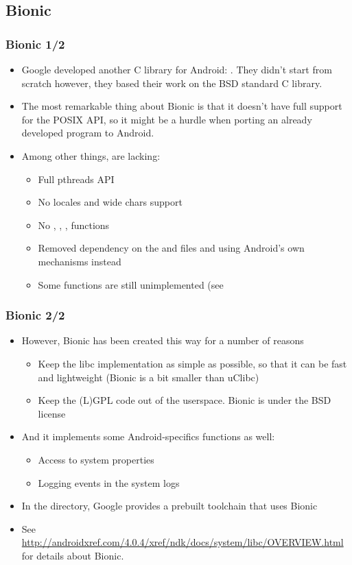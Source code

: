 \subsection{Bionic}
\begin{frame}
  \frametitle{Bionic 1/2}
  \begin{itemize}
  \item Google developed another C library for Android:
    . They didn't start from scratch however, they
    based their work on the BSD standard C library.
  \item The most remarkable thing about Bionic is that it doesn't have
    full support for the POSIX API, so it might be a hurdle when porting an
    already developed program to Android.
  \item Among other things, are lacking:
    \begin{itemize}
    \item Full pthreads API
    \item No locales and wide chars support
    \item No , , , functions
    \item Removed dependency on the  and
       files and using Android's own mechanisms instead
    \item Some functions are still unimplemented (see
    \end{itemize}
  \end{itemize}
\end{frame}

\begin{frame}
  \frametitle{Bionic 2/2}
  \begin{itemize}
  \item However, Bionic has been created this way for a number of
    reasons
    \begin{itemize}
    \item Keep the libc implementation as simple as possible, so that
      it can be fast and lightweight (Bionic is a bit smaller than
      uClibc)
    \item Keep the (L)GPL code out of the userspace. Bionic is under
      the BSD license
    \end{itemize}
  \item And it implements some Android-specifics functions as well:
    \begin{itemize}
    \item Access to system properties
    \item Logging events in the system logs
    \end{itemize}
  \item In the  directory, Google provides a prebuilt toolchain
    that uses Bionic
  \item See
    \url{http://androidxref.com/4.0.4/xref/ndk/docs/system/libc/OVERVIEW.html}
    for details about Bionic.
  \end{itemize}
\end{frame}
